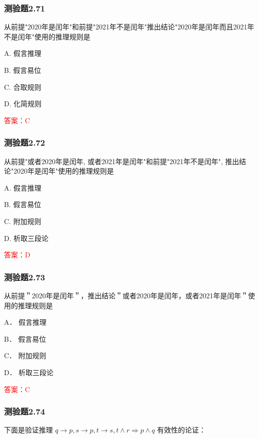 \documentclass[UTF8, heading=true]{ctexart}
\begin{document}
\subsubsection{测验题2.71}

从前提"2020年是闰年"和前提"2021年不是闰年"推出结论"2020年是闰年而且2021年不是闰年"使用的推理规则是

A. 假言推理

B. 假言易位

C. 合取规则

D. 化简规则

\textcolor{red}{答案：C}

\subsubsection{测验题2.72}

从前提"或者2020年是闰年, 或者2021年是闰年"和前提"2021年不是闰年", 推出结论"2020年是闰年"使用的推理规则是

A. 假言推理

B. 假言易位

C. 附加规则

D. 析取三段论

\textcolor{red}{答案：D}

\subsubsection{测验题2.73}

从前提＂2020年是闰年＂，推出结论＂或者2020年是闰年，或者2021年是闰年＂使用的推理规则是 $\qquad$

A．
假言推理

B．
假言易位

C．
附加规则

D．
析取三段论

\textcolor{red}{答案：C}

\subsubsection{测验题2.74}

下面是验证推理 $q \rightarrow p, s \rightarrow p, t \rightarrow s, t \wedge r \Longrightarrow p \wedge q$ 有效性的论证：

\clearpage
\end{document}
